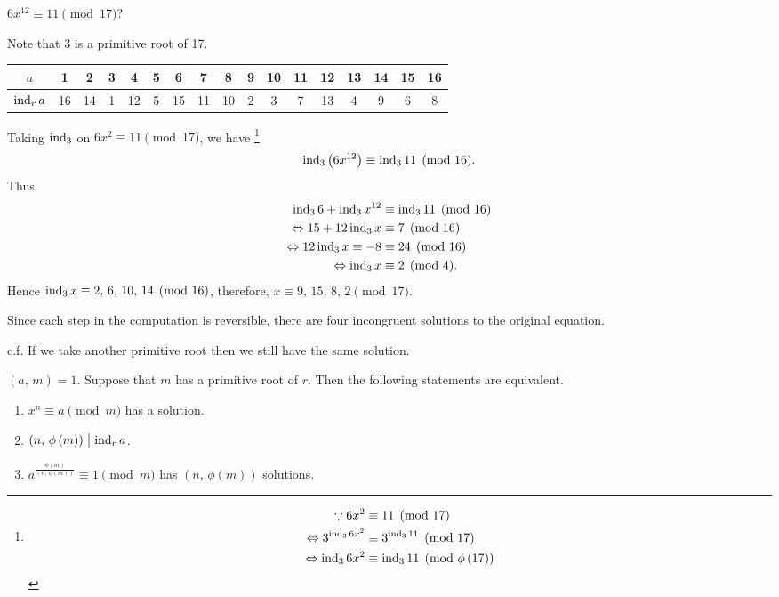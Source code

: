 \begin{example}
    $6x^{12} \equiv 11 \pmod{17}$?

    Note that 3 is a primitive root of 17.
    \begin{center}
        \begin{tabular}{c|cccccccccccccccc}
            \hline
            $a$ & 1 & 2 & 3 & 4 & 5 & 6 & 7 & 8 & 9 & 10 & 11 & 12 & 13 & 14 & 15 & 16 \\
            \hline
            $\operatorname{\mathrm{ind}}_r a$ & 16 & 14 & 1 & 12 & 5 & 15 & 11 & 10 & 2 & 3 & 7 & 13 & 4 & 9 & 6 & 8 \\
            \hline
        \end{tabular}
    \end{center}
    Taking $\operatorname{\mathrm{ind}}_3$ on $6x^2 \equiv 11 \pmod{17}$, we have
    \footnote{
        \begin{align*}
            \because 6x^2 & \equiv 11 \pmod{17} \\
            \Leftrightarrow 3^{\operatorname{\mathrm{ind}}_3 6x^2} & \equiv 3^{\operatorname{\mathrm{ind}}_3 11} \pmod{17} \\
            \Leftrightarrow \operatorname{\mathrm{ind}}_3 6x^2 & \equiv \operatorname{\mathrm{ind}}_3 11 \pmod{\phi\left(17\right)}
        \end{align*}
    }
    \[
        \operatorname{\mathrm{ind}}_3 \left(6x^{12}\right) \equiv \operatorname{\mathrm{ind}}_3 11 \pmod{16}.
    \]
    Thus
    \begin{align*}
        \operatorname{\mathrm{ind}}_3 6 + \operatorname{\mathrm{ind}}_3 x^{12} & \equiv \operatorname{\mathrm{ind}}_3 11 \pmod{16} \\
        \Leftrightarrow 15 + 12 \operatorname{\mathrm{ind}}_3 x & \equiv 7 \pmod{16} \\
        \Leftrightarrow 12 \operatorname{\mathrm{ind}}_3 x \equiv -8 & \equiv 24 \pmod{16} \\
        \Leftrightarrow \operatorname{\mathrm{ind}}_3 x & \equiv 2 \pmod{4}.
    \end{align*}
    Hence $\operatorname{\mathrm{ind}}_3 x \equiv 2,\,6,\,10,\,14 \pmod{16}$, therefore,
    $x \equiv 9,\,15,\,8,\,2 \pmod{17}$.

    Since each step in the computation is reversible, there are four
    incongruent solutions to the original equation.

    c.f. If we take another primitive root then we still have the same solution.
\end{example}

\begin{theorem}
    $\left(a,\,m\right)=1$. Suppose that $m$ has a primitive root of $r$.
    Then the following statements are equivalent.
    \begin{enumerate}
        \item $x^n \equiv a \pmod{m}$ has a solution.
        \item $\left(n,\,\phi\left(m\right)\right) \bigm| \operatorname{\mathrm{ind}}_r a$.
        \item $a^{\frac{\phi\left(m\right)}{\left(n,\,\phi\left(m\right)\right)}} \equiv 1 \pmod{m}$
        has $\left(n,\,\phi\left(m\right)\right)$ solutions.
    \end{enumerate}
\end{theorem}


